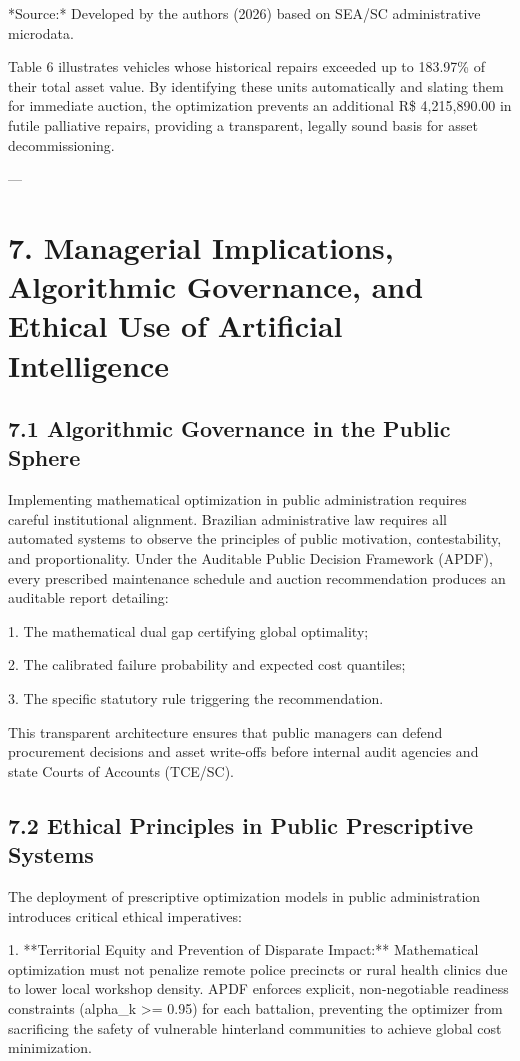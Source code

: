 \documentclass[10pt,a4paper,journal]{article}
\begin{document}
*Source:* Developed by the authors (2026) based on SEA/SC administrative microdata.

Table 6 illustrates vehicles whose historical repairs exceeded up to 183.97\% of their total asset value. By identifying these units automatically and slating them for immediate auction, the optimization prevents an additional R\$ 4,215,890.00 in futile palliative repairs, providing a transparent, legally sound basis for asset decommissioning.

---

\section{7. Managerial Implications, Algorithmic Governance, and Ethical Use of Artificial Intelligence}
\subsection{7.1 Algorithmic Governance in the Public Sphere}
Implementing mathematical optimization in public administration requires careful institutional alignment. Brazilian administrative law requires all automated systems to observe the principles of public motivation, contestability, and proportionality. Under the Auditable Public Decision Framework (APDF), every prescribed maintenance schedule and auction recommendation produces an auditable report detailing:

1. The mathematical dual gap certifying global optimality;

2. The calibrated failure probability and expected cost quantiles;

3. The specific statutory rule triggering the recommendation.

This transparent architecture ensures that public managers can defend procurement decisions and asset write-offs before internal audit agencies and state Courts of Accounts (TCE/SC).

\subsection{7.2 Ethical Principles in Public Prescriptive Systems}
The deployment of prescriptive optimization models in public administration introduces critical ethical imperatives:

1. **Territorial Equity and Prevention of Disparate Impact:** Mathematical optimization must not penalize remote police precincts or rural health clinics due to lower local workshop density. APDF enforces explicit, non-negotiable readiness constraints (alpha\_k >= 0.95) for each battalion, preventing the optimizer from sacrificing the safety of vulnerable hinterland communities to achieve global cost minimization.
\end{document}
